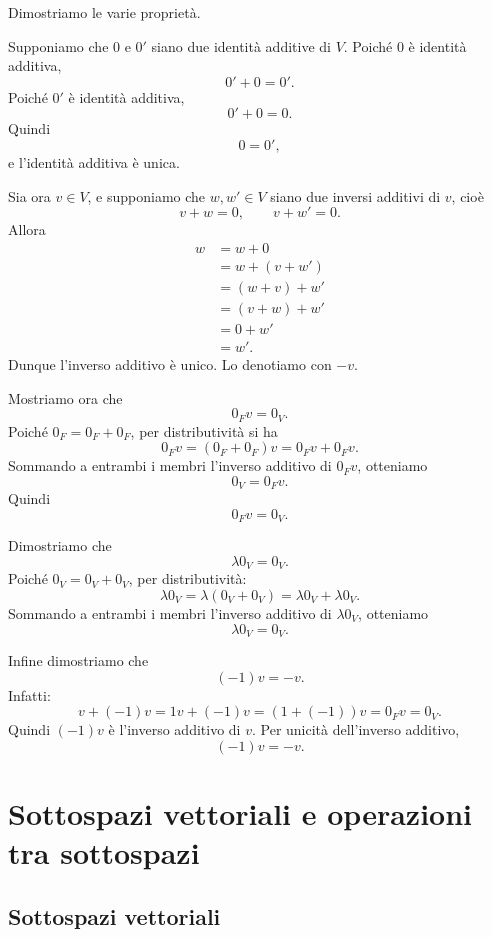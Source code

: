 \documentclass[a4paper]{article}
\begin{document}
\begin{snippetproof}{}
    Dimostriamo le varie proprietà.

    Supponiamo che \(0\) e \(0'\) siano due identità additive di \(V\). Poiché \(0\) è identità additiva,
    \[
        0'+0=0'.
    \]
    Poiché \(0'\) è identità additiva,
    \[
        0'+0=0.
    \]
    Quindi
    \[
        0=0',
    \]
    e l'identità additiva è unica.

    Sia ora \(v\in V\), e supponiamo che \(w,w'\in V\) siano due inversi additivi di \(v\), cioè
    \[
        v+w=0,
        \qquad
        v+w'=0.
    \]
    Allora
    \begin{align*}
        w
        &=w+0\\
        &=w+(v+w')\\
        &=(w+v)+w'\\
        &=(v+w)+w'\\
        &=0+w'\\
        &=w'.
    \end{align*}
    Dunque l'inverso additivo è unico. Lo denotiamo con \(-v\).

    Mostriamo ora che
    \[
        0_F v=0_V.
    \]
    Poiché \(0_F=0_F+0_F\), per distributività si ha
    \[
        0_Fv=(0_F+0_F)v=0_Fv+0_Fv.
    \]
    Sommando a entrambi i membri l'inverso additivo di \(0_Fv\), otteniamo
    \[
        0_V=0_Fv.
    \]
    Quindi
    \[
        0_Fv=0_V.
    \]

    Dimostriamo che
    \[
        \lambda 0_V=0_V.
    \]
    Poiché \(0_V=0_V+0_V\), per distributività:
    \[
        \lambda 0_V=\lambda(0_V+0_V)=\lambda 0_V+\lambda 0_V.
    \]
    Sommando a entrambi i membri l'inverso additivo di \(\lambda 0_V\), otteniamo
    \[
        \lambda 0_V=0_V.
    \]

    Infine dimostriamo che
    \[
        (-1)v=-v.
    \]
    Infatti:
    \[
        v+(-1)v
        =
        1v+(-1)v
        =
        (1+(-1))v
        =
        0_Fv
        =
        0_V.
    \]
    Quindi \((-1)v\) è l'inverso additivo di \(v\). Per unicità dell'inverso additivo,
    \[
        (-1)v=-v.
    \]
\end{snippetproof}

\section{Sottospazi vettoriali e operazioni tra sottospazi}

\subsection{Sottospazi vettoriali}
\end{document}
